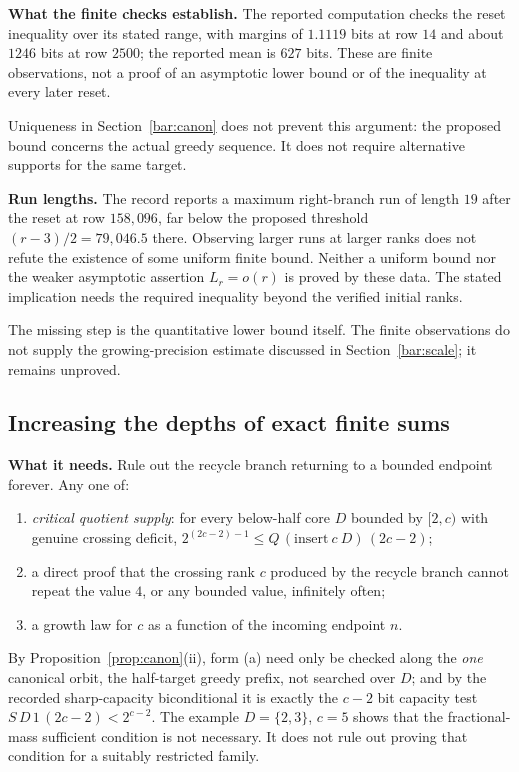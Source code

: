 \textbf{What the finite checks establish.} The reported computation
checks the reset inequality over its stated range, with margins of
$1.1119$ bits at row $14$ and about $1246$ bits at row $2500$; the reported
mean is $627$ bits.  These are finite observations, not a proof of an
asymptotic lower bound or of the inequality at every later reset.

Uniqueness in Section~\ref{bar:canon} does not prevent this argument:
the proposed bound concerns the actual greedy sequence.  It does not
require alternative supports for the same target.

\textbf{Run lengths.} The record reports a maximum right-branch run of
length $19$ after the reset at row $158{,}096$, far below the proposed threshold
$(r-3)/2=79{,}046.5$ there.  Observing larger runs at larger ranks does not
refute the existence of some uniform finite bound.  Neither a uniform
bound nor the weaker asymptotic assertion $L_r=o(r)$ is proved by these
data.  The stated implication needs the required inequality beyond the
verified initial ranks.

The missing step is the quantitative lower bound itself.  The finite
observations do not supply the growing-precision estimate discussed in
Section~\ref{bar:scale}; it remains unproved.

\subsection{Increasing the depths of exact finite sums}
\label{ssec:route-2}

\textbf{What it needs.} Rule out the recycle branch returning to a bounded endpoint forever. Any
one of:
\begin{enumerate}[nosep,label=(\alph*)]
\item \emph{critical quotient supply}: for every below-half core $D$ bounded by $[2,c)$
  with genuine crossing deficit, $2^{(2c-2)-1} \le \ensuremath{Q}\,(\mathrm{insert}\
  c\ D)\,(2c-2)$;
\item a direct proof that the crossing rank $c$ produced by the recycle branch cannot repeat the
  value $4$, or any bounded value, infinitely often;
\item a growth law for $c$ as a function of the incoming endpoint $n$.
\end{enumerate}
By Proposition~\ref{prop:canon}(ii), form (a) need only be checked along the \emph{one} canonical
orbit, the half-target greedy prefix, not searched over $D$; and by the recorded sharp-capacity
biconditional it is exactly the $c-2$ bit capacity test
$\ensuremath{S}\,D\,1\,(2c-2) < 2^{c-2}$. The example $D=\{2,3\}$, $c=5$ shows that the fractional-mass
sufficient condition is not necessary.  It does not rule out proving that
condition for a suitably restricted family.

